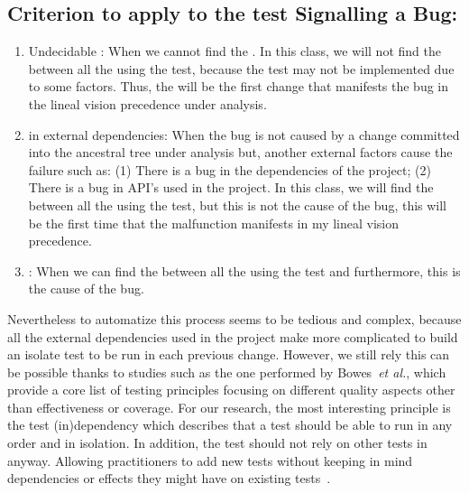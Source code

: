 \documentclass[a4paper, 12pt]{book}
\begin{document}
\subsection{Criterion to apply to the test Signalling a Bug:}
 \begin{enumerate}
	\item Undecidable \FFC : When we cannot find the \FFC. In this class, we will not find the \FFC between all the  using the test, because the test may not be implemented due to some factors. Thus, the \FFC will be the first change that manifests the bug in the lineal vision precedence under analysis.
	\item \FFC in external dependencies: When the bug is not caused by a change committed into the ancestral tree under analysis but, another external factors cause the failure such as: (1) There is a bug in the dependencies of the project; (2) There is a bug in API's used in the project. In this class, we will find the \FFC between all the  using the test, but this \FFC is not the cause of the bug, this \FFC will be the first time that the malfunction manifests in my lineal vision precedence.
	\item \FFC : When we can find the \FFC between all the  using the test and furthermore, this \FFC is the cause of the bug.
\end{enumerate}

Nevertheless to automatize this process seems to be tedious and complex, because all the external dependencies used in the project make more complicated to build an isolate test to be run in each previous change. However, we still rely this can be possible thanks to studies such as the one performed by Bowes~\emph{et al.}, which provide a core list of testing principles focusing on different quality aspects other than effectiveness or coverage. For our research, the most interesting principle is the test (in)dependency which describes that a test should be able to run in any order and in isolation. In addition, the test should  not  rely  on other tests in anyway. Allowing practitioners to add new tests without keeping in mind dependencies or effects they might have on existing tests~\cite{bowes2017good}.
\end{document}
